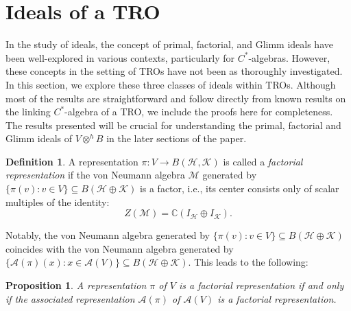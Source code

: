 \documentclass{birkjour}
\newtheorem{prop}[thm]{Proposition}
\theoremstyle{definition}
\newtheorem{defn}[thm]{Definition}
\theoremstyle{remark}
\numberwithin{equation}{section}
\begin{document}
 
 
 
 
 



















\section{Ideals of a TRO}  %

In the study of ideals, the concept of primal, factorial, and Glimm ideals have been well-explored in various contexts, particularly for $C^{\ast}$-algebras. However, these concepts in the setting of TROs have not been as thoroughly investigated. In this section, we explore these three classes of ideals within TROs. Although most of the results are straightforward and follow directly from known results on the linking $C^{\ast}$-algebra of a TRO, we include the proofs here for completeness. The results presented will be crucial for understanding the primal, factorial and Glimm ideals of $V \otimes^h B$ in the later sections of the paper. 



\begin{defn}

A representation \( \pi: V \to B(\mathcal{H}, \mathcal{K}) \) is called a \textit{factorial representation} if the von Neumann algebra \( \mathcal{M} \) generated by \( \{ \pi(v) : v \in V \} \subseteq B(\mathcal{H} \oplus \mathcal{K}) \) is a factor, i.e., its center consists only of scalar multiples of the identity:
\[
Z(\mathcal{M}) = \mathbb{C} (I_{\mathcal{H}} \oplus I_{\mathcal{K}}).
\]
    
\end{defn}

Notably, the von Neumann algebra generated by \( \{ \pi(v) : v \in V \} \subseteq B(\mathcal{H} \oplus \mathcal{K}) \) coincides with the von Neumann algebra generated by \( \{ \mathcal{A}(\pi)(x) : x \in \mathcal{A}(V) \} \subseteq B(\mathcal{H} \oplus \mathcal{K}) \). This leads to the following:

\begin{prop}
A representation \( \pi \) of \( V \) is a factorial representation if and only if the associated representation \( \mathcal{A}(\pi) \) of \( \mathcal{A}(V) \) is a factorial representation.
\end{prop}
\end{document}
